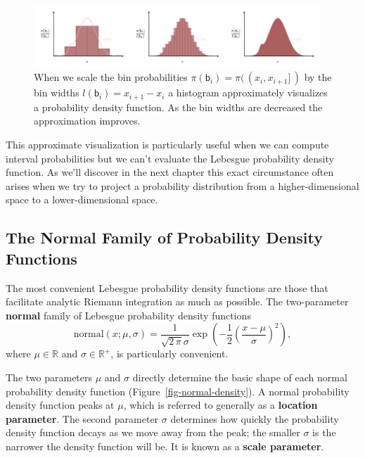 \documentclass[
  letterpaper,
  DIV=11,
  numbers=noendperiod]{scrartcl}
\begin{document}
\begin{figure}

{\centering \includegraphics[width=0.96\textwidth,height=\textheight]{figures/histogram_approximation/histogram_approximation.pdf}

}

\caption{\label{fig-histogram-approximation}When we scale the bin
probabilities
\(\pi(\mathsf{b}_{i}) = \pi( \, ( x_{i}, x_{i + 1} ] \, )\) by the bin
widths \(l(\mathsf{b}_{i}) = x_{i + 1} - x_{i}\) a histogram
approximately visualizes a probability density function. As the bin
widths are decreased the approximation improves.}

\end{figure}

This approximate visualization is particularly useful when we can
compute interval probabilities but we can't evaluate the Lebesgue
probability density function. As we'll discover in the next chapter this
exact circumstance often arises when we try to project a probability
distribution from a higher-dimensional space to a lower-dimensional
space.

\hypertarget{the-normal-family-of-probability-density-functions}{%
\subsection{The Normal Family of Probability Density
Functions}\label{the-normal-family-of-probability-density-functions}}

The most convenient Lebesgue probability density functions are those
that facilitate analytic Riemann integration as much as possible. The
two-parameter \textbf{normal} family of Lebesgue probability density
functions \[
\mathrm{normal}(x; \mu, \sigma)
=
\frac{1}{\sqrt{2 \, \pi} \sigma}
\exp \left( -\frac{1}{2} \left( \frac{x - \mu}{\sigma} \right)^{2} \right),
\] where \(\mu \in \mathbb{R}\) and \(\sigma \in \mathbb{R}^{+}\), is
particularly convenient.

The two parameters \(\mu\) and \(\sigma\) directly determine the basic
shape of each normal probability density function
(Figure~\ref{fig-normal-density}). A normal probability density function
peaks at \(\mu\), which is referred to generally as a \textbf{location
parameter}. The second parameter \(\sigma\) determines how quickly the
probability density function decays as we move away from the peak; the
smaller \(\sigma\) is the narrower the density function will be. It is
known as a \textbf{scale parameter}.
\end{document}
